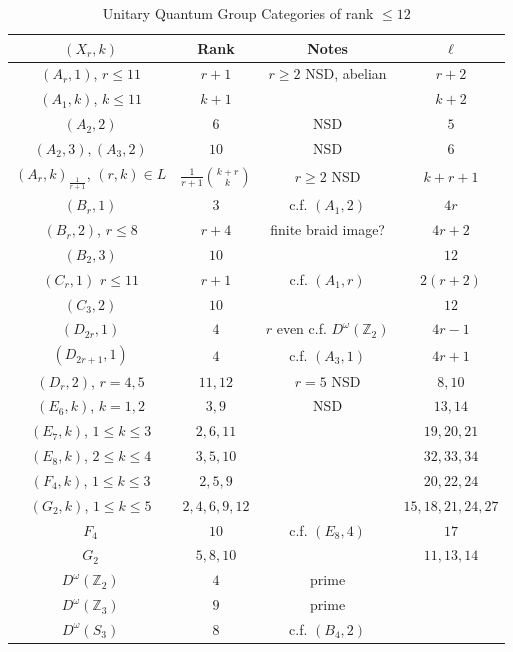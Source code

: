 \documentclass[12pt,psamsfonts]{amsart}
\newcommand{\Z}{\mathbb Z}
\numberwithin{equation}{section}
\theoremstyle{definition}
\begin{document}
\begin{table}\caption{Unitary Quantum Group Categories of rank $\le 12$}\label{rank12}
\begin{tabular}{*{4}{|c}|}
\hline
$(X_r,k)$ & Rank & Notes & $\ell$\\
\hline\hline
 $(A_r,1)$, $r\leq 11$ & $r+1$  & $r\ge 2$ NSD, abelian & $r+2$\\
\hline $(A_1,k)$, $k\leq 11$ & $k+1$ &  & $k+2$\\
\hline $(A_2,2)$ & $6$ & NSD & $5$\\
\hline $(A_2,3),(A_3,2)$ & $10$ & NSD & $6$\\
\hline $(A_r,k)_{\frac{1}{r+1}}$, $(r,k)\in L$& $\frac{1}{r+1}\binom{k+r}{k}$ & $r\ge 2$ NSD  & $k+r+1$
\\ \hline  $(B_r,1)$ & $3$ &  c.f. $(A_1,2)$ & $4r$
\\ \hline  $(B_r,2)$, $r\leq 8$ & $r+4$  & finite braid image? & $4r+2$
\\ \hline  $(B_2,3)$& $10$  &  & $12$
\\ \hline  $(C_r,1)$ $r\leq 11$ & $r+1$  & c.f. $(A_1,r)$ &  $2(r+2)$
\\ \hline  $(C_3,2)$ & $10$  & & $12$
\\ \hline  $(D_{2r},1)$ & $4$ & $r$ even c.f. $D^\omega(\Z_2)$ & $4r-1$
\\ \hline  $(D_{2r+1},1)$ & $4$ &  c.f. $(A_3,1)$ & $4r+1$
\\ \hline  $(D_r,2)$, $r=4,5$& $11,12$  & $r=5$ NSD & $8,10$
\\ \hline  $(E_6,k)$, $k=1,2$ & $3,9$ & NSD & $13,14$
\\ \hline  $(E_7,k)$, $1\leq k\leq 3$& $2,6,11$& & $19,20,21$
\\ \hline  $(E_8,k)$, $2\leq k\leq 4$& $3,5,10$ & & $32,33,34$
\\ \hline  $(F_4,k)$, $1\leq k\leq 3$& $2,5,9$ & & $20,22,24$
\\ \hline  $(G_2,k)$, $1\leq k\leq 5$& $2,4,6,9,12$ & & $15,18,21,24,27$
\\ \hline $F_4$ & $10$ & c.f. $(E_8,4)$ & $17$
\\ \hline $G_2$ & $5,8,10$ &  & $11,13,14$
\\ \hline $D^\omega(\Z_2)$ & $4$ & prime &
\\ \hline $D^\omega(\Z_3)$ & $9$ & prime &
\\ \hline $D^\omega(S_3)$ & $8$ & c.f. $(B_4,2)$ &
\\
\hline
\end{tabular}
\end{table}
\end{document}
